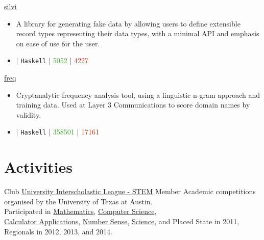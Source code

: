 \documentclass[10pt,letterpaper,sans]{moderncv}
\newcommand{\ghCommit}[1]{%
\begin{tikzpicture}[y=0.7pt,x=0.7pt,yscale=-1, inner sep=0pt, outer sep=0pt]%
  \path[even odd rule,fill=#1]%
  (10.86,7.00) .. controls (10.41,5.28) and%
  (8.86,4.00) .. (7.00,4.00) .. controls (5.14,4.00) and%
  (3.59,5.28) .. (3.14,7.00) -- (0.00,7.00) -- (0.00,9.00) --%
  (3.14,9.00) .. controls (3.59,10.72) and (5.14,12.00) ..%
  (7.00,12.00) .. controls (8.86,12.00) and (10.41,10.72) ..%
  (10.86,9.00) -- (14.00,9.00) -- (14.00,7.00) -- (10.86,7.00)%
  -- cycle(7.00,10.20) .. controls (5.78,10.20) and (4.80,9.22) ..%
  (4.80,8.00) .. controls (4.80,6.78) and (5.78,5.80) ..%
  (7.00,5.80) .. controls (8.22,5.80) and (9.20,6.78) ..%
  (9.20,8.00) .. controls (9.20,9.22) and (8.22,10.20) ..%
  (7.00,10.20) -- cycle;%
\end{tikzpicture}}
\newcommand{\wlink}[2]{\textcolor[HTML]{0020B6}{\href{#1}{#2}}}
\newcommand{\ghlink}[2]{\wlink{https://github.com/#1}{#2}}
\newcommand{\ghrepo}[1]{\ghlink{#1}{\faGithub}}
\newcommand{\ghlang}[1]{\texttt{#1}}
\newcommand{\ghcom}[1]{\textcolor[HTML]{666666}{\ghCommit{} #1}}
\newcommand{\ghadd}[1]{\textcolor[HTML]{30A622}{{\faPlusCircle} #1}}
\newcommand{\ghrem}[1]{\textcolor[HTML]{BD2C00}{{\faMinusCircle} #1}}
\newcommand{\ghtr}[0]{}
\newcommand{\ghub}[4]{\ghrepo{#2} | \ghlang{#1} | \ghadd{#3} | \ghrem{#4}}
\newcommand{\ghtable}[6]{#1 & #2 & #3 & #4 & #5 & #6 \\}
\newcommand{\ght}[9]{%
  \ghtable{#1}
          {\ghlink{#2/#3}{#3}}
          {\ghlang{#4}}
          {\ghcom{#5}}
          {\ghadd{#6}}
          {\ghrem{#7}}%
}
\begin{document}
\cventry{}
        {\wlink{https://github.com/chessai/silvi}{silvi}}
        {}{}{}
        {
\begin{itemize}
\item A library for generating fake data by allowing users to define extensible record types representing their data types, with a minimal API and emphasis on ease of use for the user.
\item \ghub{Haskell}{chessai/silvi}{5052}{4227}
\end{itemize}
}

\cventry{}
        {\wlink{https://github.com/chessai/freq}{freq}}
        {}{}{}
        {
\begin{itemize}
\item Cryptanalytic frequency analysis tool, using a linguistic n-gram approach and training data. Used at Layer 3 Communications to score domain names by validity.
\item \ghub{Haskell}{chessai/freq}{358501}{17161}
\end{itemize}
}


\section{Activities}
        {Club}
        {\wlink{http://www.uiltexas.org/academics/stem}{University Interscholastic League - STEM}}
        {Member}{}{
        Academic competitions organised by the University of Texas at Austin. \\ %
        Participated in %
        \wlink{http://www.uiltexas.org/academics/stem/mathematics}{Mathematics}, %
        \wlink{http://www.uiltexas.org/academics/stem/computer-science}{Computer Science}, \\ %
        \wlink{http://www.uiltexas.org/academics/stem/calculator-applications}{Calculator Applications}, %
        \wlink{http://www.uiltexas.org/academics/stem/number-sense}{Number Sense}, %
        \wlink{http://www.uiltexas.org/academics/stem/science}{Science}, and %
        Placed State in 2011, Regionals in 2012, 2013, and 2014.
}          
\end{document}
